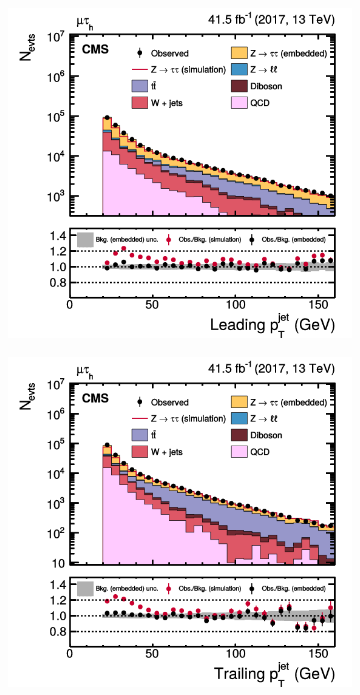 \begin{figure}[!ht]
  \begin{subfigure}[b]{0.33\linewidth}
    \centering
    \includegraphics[width=\linewidth]{Chapitre4/Images/leadj_embed.png} 
    \caption*{} 
    \vspace{0.5ex}
  \end{subfigure}%
  \begin{subfigure}[b]{0.33\linewidth}
    \centering
    \includegraphics[width=\linewidth]{Chapitre4/Images/trailj_embed.png} 

\end{subfigure}
\end{figure}
